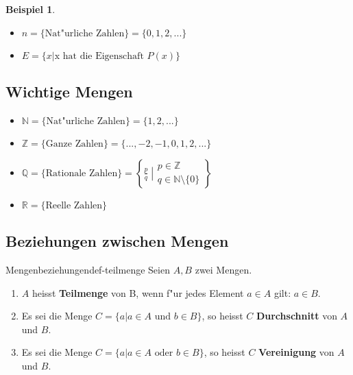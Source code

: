 \documentclass[11pt]{article}
\newtheorem{exa}{Beispiel}[section]
\begin{document}
\begin{exa}\
\begin{itemize}
\item \(n=\{\text{Nat"urliche Zahlen}\} = \{0,1,2,...\}\)
\item \(E=\{x|\text{x hat die Eigenschaft } P(x)\}\)
\end{itemize}
\end{exa}

\subsection{Wichtige Mengen}
\label{sec:orga565e26}
\begin{itemize}
\item \(\mathbb{N}=\{\text{Nat"urliche Zahlen}\} = \{1,2,...\}\)
\item \(\mathbb{Z}=\{\text{Ganze Zahlen}\} = \{...,-2,-1,0,1,2,...\}\)
\item \(\mathbb{Q}=\{\text{Rationale
   Zahlen}\}=\left\{\left.\displaystyle\frac{p}{q}\;\right\vert\begin{array}{c}p \in \mathbb{Z} \\ q \in \mathbb{N} \setminus \{0\}\end{array}\right\}\)
\item \(\mathbb{R}=\{\text{Reelle Zahlen}\}\)
\end{itemize}

\subsection{Beziehungen zwischen Mengen}
\label{sec:orgcffbbc3}
\begin{definition}{Mengenbeziehungen}{def-teilmenge}
Seien \(A,B\) zwei Mengen. 
\begin{enumerate}
\item \(A\) heisst \textbf{Teilmenge} von B, wenn f"ur jedes Element \(a\in A\) gilt: \(a\in B\).
\item Es sei die Menge \(C = \{a|a\in A \text{ und } b\in B\}\), so heisst \(C\) \textbf{Durchschnitt} von \(A\) und \(B\).
\item Es sei die Menge \(C = \{a|a\in A \text{ oder } b\in B\}\), so heisst \(C\) \textbf{Vereinigung} von \(A\) und \(B\).
\end{enumerate}
\end{definition}
\end{document}
